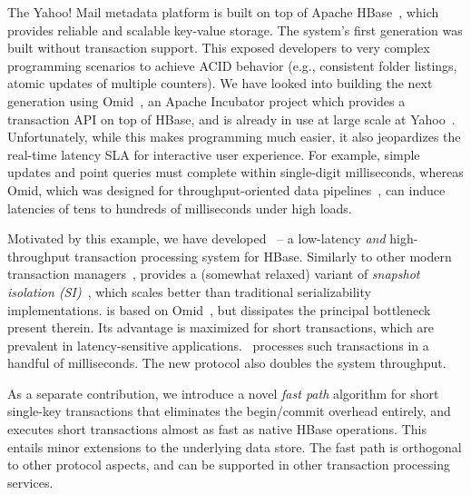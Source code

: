 The Yahoo! Mail metadata platform is built on top of Apache HBase~\cite{hbase}, 
which provides reliable and scalable key-value storage. The system's first generation
was built without transaction support. This exposed  developers to very complex programming scenarios 
to achieve ACID behavior (e.g., consistent folder listings, atomic updates of multiple counters). 
We have looked into building the next generation using  Omid~\cite{omid}, 
an Apache Incubator project which provides a transaction API on top of HBase, and 
is already in use at large scale at Yahoo~\cite{Omid2017}.
Unfortunately, while this makes programming much easier, it also jeopardizes 
the real-time latency SLA for interactive user experience. For example,  
simple updates and point queries must complete within single-digit milliseconds, 
whereas Omid, which was designed for throughput-oriented data pipelines~\cite{Omid2017}, 
can induce latencies of tens to hundreds of milliseconds under high loads. 

Motivated by this example, we have developed {\sys\/}~-- a low-latency {\em and\/} high-throughput 
transaction processing system for HBase. Similarly to other modern transaction 
managers~\cite{Percolator2010,Spanner2012,Omid2017,cockroach},
{\sys\/} provides a (somewhat relaxed) variant of \emph{snapshot isolation (SI)}~\cite{DBLP:conf/sigmod/BerensonBGMOO95},
which scales better than traditional serializability implementations. {\sys\/} is based on Omid~\cite{omid}, 
but dissipates the principal bottleneck present therein.
Its advantage is maximized for short  transactions, which are prevalent in latency-sensitive applications.
\sys\ processes  such transactions in a handful of milliseconds. The new protocol  also doubles the system 
throughput.

As a separate contribution, we introduce a novel {\em fast path\/} algorithm for short single-key transactions 
that eliminates the begin/commit overhead entirely, and executes short transactions 
 almost as fast as native HBase operations. This entails minor extensions to the underlying 
data store. The fast path is orthogonal to other protocol aspects, and can be  supported in other 
transaction processing services. 

